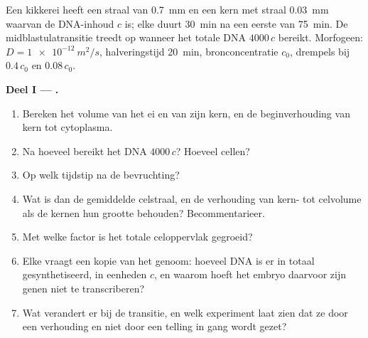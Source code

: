 \begin{problem}
\label{pb:b2:vertebrate-development:1}
Een kikkerei heeft een straal van \qty{0.7}{mm} en een kern met straal
\qty{0.03}{mm} waarvan de DNA-inhoud $c$ is; elke  duurt
\qty{30}{min} na een eerste van \qty{75}{min}. De midblastulatransitie
treedt op wanneer het totale DNA $4000\,c$ bereikt. Morfogeen: $D =
\qty{1e-12}{m^2/s}$, halveringstijd \qty{20}{min}, bronconcentratie
$c_0$, drempels bij $0.4\,c_0$ en $0.08\,c_0$.

\medskip
\noindent\textbf{Deel I --- .}
\begin{enumerate}
  \item Bereken het volume van het ei en van zijn kern, en de
        beginverhouding van kern tot cytoplasma.
  \item Na hoeveel  bereikt het DNA $4000\,c$? Hoeveel
        cellen?
  \item Op welk tijdstip na de bevruchting?
  \item Wat is dan de gemiddelde celstraal, en de verhouding van kern- tot
        celvolume als de kernen hun grootte behouden? Becommentarieer.
  \item Met welke factor is het totale celoppervlak gegroeid?
  \item Elke  vraagt een kopie van het genoom: hoeveel DNA is er in
        totaal gesynthetiseerd, in eenheden $c$, en waarom hoeft het embryo
        daarvoor zijn genen niet te transcriberen?
  \item Wat verandert er bij de transitie, en welk experiment laat zien dat
        ze door een verhouding en niet door een telling in gang wordt gezet?
\end{enumerate}


\end{problem}
